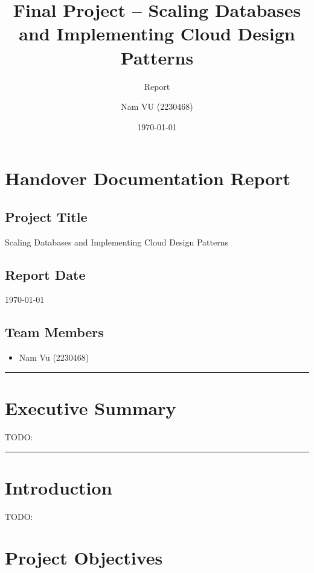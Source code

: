 \documentclass[letterpaper,headings=standardclasses,parskip=half]{scrartcl}
\title{Final Project – Scaling Databases and Implementing Cloud Design Patterns}
\subtitle{Report}
\author{Nam VU (2230468)}
\date{\today}
\begin{document}
\maketitle
\thispagestyle{empty}

\clearpage
{}

\tableofcontents

\clearpage

\section*{Handover Documentation Report}

\subsection*{Project Title}

Scaling Databases and Implementing Cloud Design Patterns

\subsection*{Report Date}

\today

\subsection*{Team Members}

\begin{itemize}
    \item Nam Vu (2230468)
\end{itemize}

\noindent\rule{\textwidth}{0.3pt}

\section*{Executive Summary}

TODO:

\noindent\rule{\textwidth}{0.3pt}

\section{Introduction}

TODO:

\section{Project Objectives}
\end{document}
